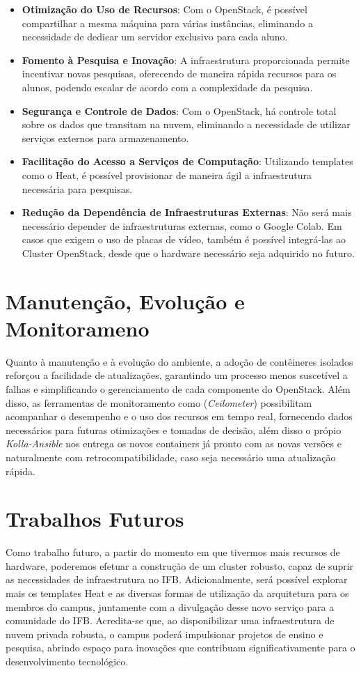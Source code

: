 \begin{itemize}
    \item \textbf{Otimização do Uso de Recursos}: Com o OpenStack, é possível compartilhar a mesma máquina para várias instâncias, eliminando a necessidade de dedicar um servidor exclusivo para cada aluno.
    \item \textbf{Fomento à Pesquisa e Inovação}: A infraestrutura proporcionada permite incentivar novas pesquisas, oferecendo de maneira rápida recursos para os alunos, podendo escalar de acordo com a complexidade da pesquisa.
    \item \textbf{Segurança e Controle de Dados}: Com o OpenStack, há controle total sobre os dados que transitam na nuvem, eliminando a necessidade de utilizar serviços externos para armazenamento.
    \item \textbf{Facilitação do Acesso a Serviços de Computação}: Utilizando templates como o Heat, é possível provisionar de maneira ágil a infraestrutura necessária para pesquisas.
    \item \textbf{Redução da Dependência de Infraestruturas Externas}: Não será mais necessário depender de infraestruturas externas, como o Google Colab. Em casos que exigem o uso de placas de vídeo, também é possível integrá-las ao Cluster OpenStack, desde que o hardware necessário seja adquirido no futuro.
\end{itemize}


\section{Manutenção, Evolução e Monitorameno}
Quanto à manutenção e à evolução do ambiente, a adoção de contêineres isolados reforçou a facilidade de atualizações, garantindo um processo menos suscetível a falhas e simplificando o gerenciamento de cada componente do OpenStack. Além disso, as ferramentas de monitoramento como (\textit{Ceilometer}) possibilitam acompanhar o desempenho e o uso dos recursos em tempo real, fornecendo dados necessários para futuras otimizações e tomadas de decisão, além disso o própio \textit{Kolla-Ansible} nos entrega os novos containers já pronto com as novas versões e naturalmente com retrocompatibilidade, caso seja necessário uma atualização rápida.


\section{Trabalhos Futuros}
Como trabalho futuro, a partir do momento em que tivermos mais recursos de hardware, poderemos efetuar a construção de um cluster robusto, capaz de suprir as necessidades de infraestrutura no IFB. Adicionalmente, será possível explorar mais os templates Heat e as diversas formas de utilização da arquitetura para os membros do campus, juntamente com a divulgação desse novo serviço para a comunidade do IFB. Acredita-se que, ao disponibilizar uma infraestrutura de nuvem privada robusta, o campus poderá impulsionar projetos de ensino e pesquisa, abrindo espaço para inovações que contribuam significativamente para o desenvolvimento tecnológico.